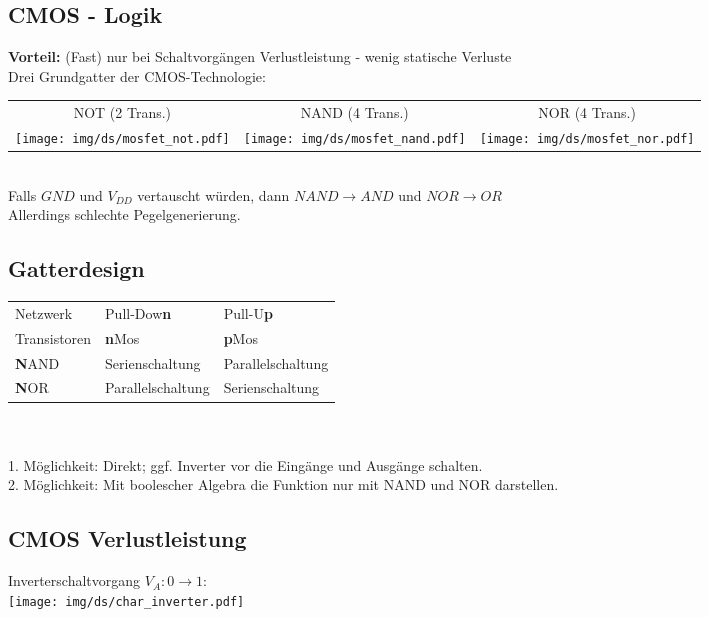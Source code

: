 \documentclass[6pt,a4paper]{scrartcl}
\renewcommand{\emph}[1]{\textsf{\textbf{#1}}}
\newcommand{\ra}[0]{\ensuremath{\rightarrow}} 									%
\begin{document}
\begin{multicols*}{3}
\section{CMOS - Logik}
	\emph{Vorteil:}	 (Fast) nur bei Schaltvorgängen Verlustleistung - wenig statische Verluste \\
Drei Grundgatter der CMOS-Technologie:\\
	\begin{tabular}{ccc}
		NOT (2 Trans.) & NAND (4 Trans.) & NOR (4 Trans.)\\
		\texttt{[image: img/ds/mosfet\_not.pdf]} \qquad & \texttt{[image: img/ds/mosfet\_nand.pdf]} \qquad & \texttt{[image: img/ds/mosfet\_nor.pdf]} \\
	\end{tabular}\\
	Falls $GND$ und $V_{DD}$ vertauscht würden, dann $NAND \ra AND$ und $NOR \ra OR$\\
	Allerdings schlechte Pegelgenerierung.
	
	\subsection{Gatterdesign}
	\begin{tabular}{l|l|l}
		Netzwerk & Pull-Dow\bf{n} & Pull-U\bf{p} \\
		Transistoren & \textbf{n}Mos & \textbf{p}Mos \\ \hline
		\textbf{N}AND & Serienschaltung	 & Parallelschaltung \\
		\textbf{N}OR & Parallelschaltung & Serienschaltung \\
	\end{tabular}\\ \\
	1. Möglichkeit: Direkt; ggf. Inverter vor die Eingänge und Ausgänge schalten.\\
	2. Möglichkeit: Mit boolescher Algebra die Funktion nur mit NAND und NOR darstellen.
	\subsection{CMOS Verlustleistung}
	Inverterschaltvorgang $V_A: 0 \ra 1$:\\
	\texttt{[image: img/ds/char\_inverter.pdf]}
	

\end{multicols*}
\end{document}
